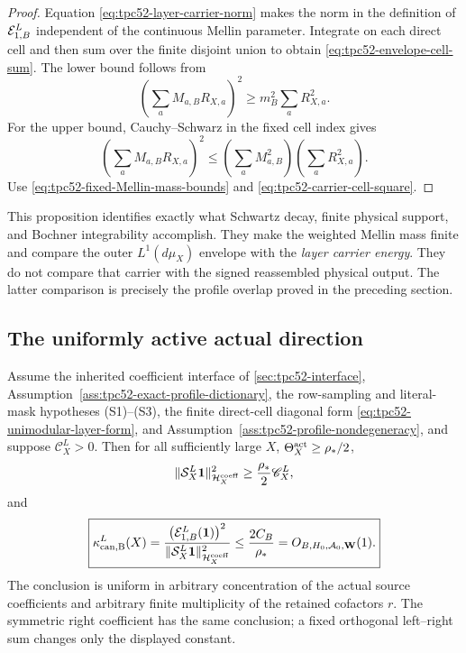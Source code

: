 \begin{proof}
Equation \eqref{eq:tpc52-layer-carrier-norm} makes the norm in the definition
of \(\mathcal E_{1,B}^L\) independent of the continuous Mellin parameter.  Integrate
on each direct cell and then sum over the finite disjoint union to obtain
\eqref{eq:tpc52-envelope-cell-sum}.  The lower bound follows from
\[
 \left(\sum_aM_{a,B}R_{X,a}\right)^2
 \ge m_B^2\sum_aR_{X,a}^2.
\]
For the upper bound, Cauchy--Schwarz in the fixed cell index gives
\[
 \left(\sum_aM_{a,B}R_{X,a}\right)^2
 \le\left(\sum_aM_{a,B}^2\right)
       \left(\sum_aR_{X,a}^2\right).
\]
Use \eqref{eq:tpc52-fixed-Mellin-mass-bounds} and
\eqref{eq:tpc52-carrier-cell-square}.
\end{proof}

This proposition identifies exactly what Schwartz decay, finite physical
support, and Bochner integrability accomplish.  They make the weighted
Mellin mass finite and compare the outer \(L^1(d\mu_X)\) envelope with the
\emph{layer carrier energy}.  They do not compare that carrier with the
signed reassembled physical output.  The latter comparison is precisely the
profile overlap proved in the preceding section.

\subsection{The uniformly active actual direction}

\begin{theorem}
\label{thm:tpc52-coefficientwise-actual-bridge}
Assume the inherited coefficient interface of
\cref{sec:tpc52-interface},
Assumption~\ref{ass:tpc52-exact-profile-dictionary}, the row-sampling and
literal-mask hypotheses
\textup{(S1)}--\textup{(S3)}, the finite direct-cell diagonal form
\eqref{eq:tpc52-unimodular-layer-form}, and
Assumption~\ref{ass:tpc52-profile-nondegeneracy}, and suppose
\(\mathscr C_X^L>0\).  Then for all sufficiently large \(X\),
\(\Theta_X^{\rm act}\ge\rho_*/2\),
\begin{equation}
 \|\mathcal S_X^L\mathbf 1\|_{\mathcal H_X^{\rm coeff}}^2
 \ge \frac{\rho_*}{2}\mathscr C_X^L,
 \label{eq:tpc52-actual-output-lower}
\end{equation}
and
\begin{equation}
 \boxed{
 \kappa_{\rm can,B}^L(X)
 =\frac{\bigl(\mathcal E_{1,B}^L(\mathbf 1)\bigr)^2}
   {\|\mathcal S_X^L\mathbf 1\|_{\mathcal H_X^{\rm coeff}}^2}
 \le \frac{2C_B}{\rho_*}=O_{B,H_0,\mathcal A_0,\mathbf W}(1).}
 \label{eq:tpc52-actual-condition-bound}
\end{equation}
The conclusion is uniform in arbitrary concentration of the actual source
coefficients and arbitrary finite multiplicity of the retained cofactors
\(r\).  The symmetric right coefficient has the same conclusion; a fixed
orthogonal left--right sum changes only the displayed constant.
\end{theorem}


